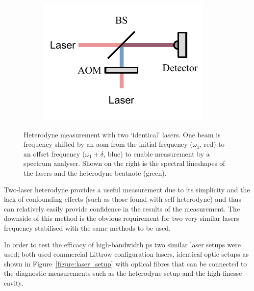 \begin{figure}
    \begin{subfigure}{0.49\linewidth}
    \includegraphics{part1/Figs/HeterodyneTwoLasers.pdf}
    \end{subfigure}
    \begin{subfigure}{0.49\linewidth}
    
    \end{subfigure}
    \caption{Heterodyne measurement with two `identical' lasers. One beam is frequency shifted by an \gls{aom} from the initial frequency ($\omega_1$, red) to an offset frequency ($\omega_1+\delta$, blue) to enable measurement by a spectrum analyser. Shown on the right is the spectral lineshapes of the lasers and the heterodyne beatnote (green).}
    \label{figure:two-laser_heterodyne}
\end{figure}

Two-laser heterodyne provides a useful measurement due to its simplicity and the lack of confounding effects (such as those found with self-heterodyne) and thus can relatively easily provide confidence in the results of the measurement.
The downside of this method is the obvious requirement for two very similar lasers frequency stabilised with the same methods to be used.

In order to test the efficacy of high-bandwidth \gls{ps} two similar laser setups were used; both used commercial Littrow configuration lasers, identical optic setups as shown in Figure~\ref{figure:laser_setup} with optical fibres that can be connected to the diagnostic measurements such as the heterodyne setup and the high-finesse cavity.

